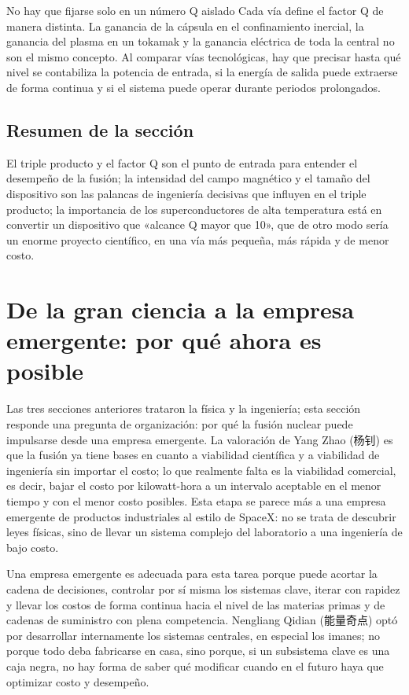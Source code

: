 \documentclass[a4paper]{article}
\begin{document}
\begin{warningbox}{No hay que fijarse solo en un número Q aislado}
Cada vía define el factor Q de manera distinta. La ganancia de la cápsula en el confinamiento inercial, la ganancia del plasma en un tokamak y la ganancia eléctrica de toda la central no son el mismo concepto. Al comparar vías tecnológicas, hay que precisar hasta qué nivel se contabiliza la potencia de entrada, si la energía de salida puede extraerse de forma continua y si el sistema puede operar durante periodos prolongados.
\end{warningbox}

\subsection{Resumen de la sección}

El triple producto y el factor Q son el punto de entrada para entender el desempeño de la fusión; la intensidad del campo magnético y el tamaño del dispositivo son las palancas de ingeniería decisivas que influyen en el triple producto; la importancia de los superconductores de alta temperatura está en convertir un dispositivo que «alcance Q mayor que 10», que de otro modo sería un enorme proyecto científico, en una vía más pequeña, más rápida y de menor costo.
\section{De la gran ciencia a la empresa emergente: por qué ahora es posible}

Las tres secciones anteriores trataron la física y la ingeniería; esta sección responde una pregunta de organización: por qué la fusión nuclear puede impulsarse desde una empresa emergente. La valoración de Yang Zhao (杨钊) es que la fusión ya tiene bases en cuanto a viabilidad científica y a viabilidad de ingeniería sin importar el costo; lo que realmente falta es la viabilidad comercial, es decir, bajar el costo por kilowatt-hora a un intervalo aceptable en el menor tiempo y con el menor costo posibles. Esta etapa se parece más a una empresa emergente de productos industriales al estilo de SpaceX: no se trata de descubrir leyes físicas, sino de llevar un sistema complejo del laboratorio a una ingeniería de bajo costo.

Una empresa emergente es adecuada para esta tarea porque puede acortar la cadena de decisiones, controlar por sí misma los sistemas clave, iterar con rapidez y llevar los costos de forma continua hacia el nivel de las materias primas y de cadenas de suministro con plena competencia. Nengliang Qidian (能量奇点) optó por desarrollar internamente los sistemas centrales, en especial los imanes; no porque todo deba fabricarse en casa, sino porque, si un subsistema clave es una caja negra, no hay forma de saber qué modificar cuando en el futuro haya que optimizar costo y desempeño.
\end{document}
